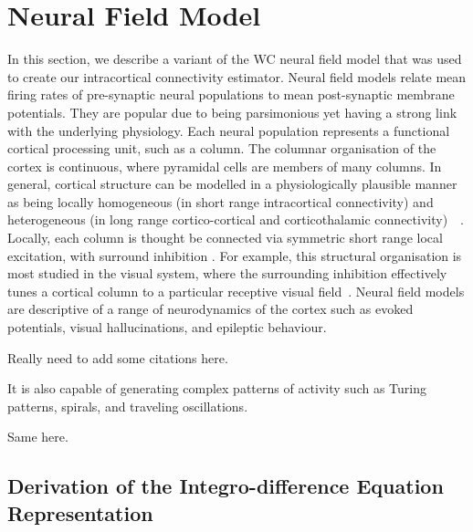 \documentclass[12pt]{iopart}
\begin{document}
\section{Neural Field Model}\label{NeuralModelSection} In this section, we describe a variant of the WC neural field model \cite{Wilson1973} that was used to create our intracortical connectivity estimator. Neural field models relate mean firing rates of pre-synaptic neural populations to mean post-synaptic membrane potentials. They are popular due to being parsimonious yet having a strong link with the underlying physiology. Each neural population represents a functional cortical processing unit, such as a column. The columnar organisation of the cortex is continuous, where pyramidal cells are members of many columns. In general, cortical structure can be modelled in a physiologically plausible manner as being locally homogeneous (in short range intracortical connectivity) and heterogeneous (in long range cortico-cortical and corticothalamic connectivity)~\cite{Jirsa2009}~\cite{Qubbaj2007}. Locally, each column is thought be connected via symmetric short range local excitation, with surround inhibition \cite{Braitenberg1998}. For example, this structural organisation is most studied in the visual system, where the surrounding inhibition effectively tunes a cortical column to a particular receptive visual field~\cite{Sullivan2006}. Neural field models are descriptive of a range of neurodynamics of the cortex such as evoked potentials, visual hallucinations, and epileptic behaviour. 
\begin{todo}
	{Really need to add some citations here.} 
\end{todo}
It is also capable of generating complex patterns of activity such as Turing patterns, spirals, and traveling oscillations. 
\begin{todo}
	{Same here.} 
\end{todo}

\subsection{Derivation of the Integro-difference Equation Representation}
\end{document}
